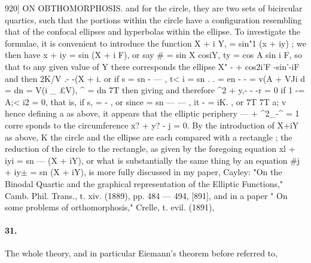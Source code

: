 \documentclass[11pt,a4paper]{book}
\begin{document}
{{{{920]  ON    OBTHOMORPHOSIS.
and  for  the  circle,  they  are  two  sets  of  bicircular  quartics,  such  that  the  portions
within  the  circle  have  a  configuration  resembling  that  of  the  confocal  ellipses  and
hyperbolas  within  the  ellipse.  To  investigate  the  formulae,  it  is  convenient  to  introduce
the  function
X  +  i  Y,     =  sin"1  (x  +  iy) ;
we  then  have
x  +  iy  =  sin  (X  +  i  F),
or  say
\#  =  sin  X  cosiY,     ty  =  cos  A  sin  i  F,
so  that  to  any  given  value  of  Y  there  corresponds  the  ellipse
X"
-  +
cos2i'F     -sin'-iF
and  then
2K/V     .-
-(X  +  i.
or  if
s  =  sn  -    ---  ,  t< i  =  sn
.  .
=  en  -      -  =  v(A  +  VJi
d  =  dn  =  V(i  \_  £V),     ^  =  dn
7T
then
giving
and  therefore  ^2  +  y,-  -  -r  =  0  if  1  -=   A;< i2  =  0,  that  is,  if  s,  =  -    ,  or  since
=  sn  ---     ---  ,     it        -  =  iK.  ,     or
7T  7T
a;          v
hence   defining   a   as   above,   it   appears   that   the   elliptic   periphery   ---  +  ^2\_-^  =  1   corre
sponds   to   the   circumference   x?  +  y?  -  j  =  0.     By   the   introduction   of  X+iY  as   above,
K
the  circle  and  the  ellipse  are  each  compared  with  a  rectangle  ;  the  reduction  of  the
circle  to  the  rectangle,  as  given  by  the  foregoing  equation  xl  +  iyi  =  sn  ---  (X  +  iY),
or  what  is  substantially  the  same  thing  by  an  equation  \#j  +  iy$\pm$  =  sn  (X  +  iY),  is
more  fully  discussed  in  my  paper,  Cayley:  "On  the  Binodal  Quartic  and  the  graphical
representation  of  the  Elliptic  Functions,"  Camb.  Phil.  Trans.,  t.  xiv.  (1889),  pp.  484  ---
494,  [891],  and  in  a  paper  "  On  some  problems  of  orthomorphosis,"  Crelle,  t.  evil.  (1891),
\paragraph{31.} The   whole   theory,   and   in   particular    Eiemann's    theorem    before    referred    to,


}}}}
\end{document}
